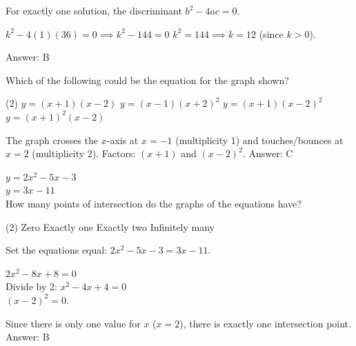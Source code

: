 \documentclass[11pt,paper=a4,answers]{exam}
\begin{document}
\begin{questions}
\begin{solution}
For exactly one solution, the discriminant $b^2 - 4ac = 0$.
\vspace{5pt}
\begin{center}
$k^2 - 4(1)(36) = 0 \implies k^2 - 144 = 0$
\vspace{5pt}
$k^2 = 144 \implies k = 12$ (since $k > 0$).
\end{center}
\vspace{5pt}
Answer: \colorbox{yellow!100}{B}
\end{solution}

\vspace{1cm}

\question
\begin{center}
\end{center}
Which of the following could be the equation for the graph shown?
\begin{tasks}(2)
    \task $y = (x+1)(x-2)$
    \task $y = (x-1)(x+2)^2$
    \task $y = (x+1)(x-2)^2$
    \task $y = (x+1)^2(x-2)$
\end{tasks}

\begin{solution}
The graph crosses the $x$-axis at $x = -1$ (multiplicity 1) and touches/bounces at $x = 2$ (multiplicity 2).
\vspace{5pt}
Factors: $(x + 1)$ and $(x - 2)^2$.
\vspace{5pt}
Answer: \colorbox{yellow!100}{C}
\end{solution}

\vspace{1cm}

\question
$y = 2x^2 - 5x - 3$ \\
$y = 3x - 11$ \\
How many points of intersection do the graphs of the equations have?
\begin{tasks}(2)
    \task Zero \task Exactly one \task Exactly two \task Infinitely many
\end{tasks}

\begin{solution}
Set the equations equal: $2x^2 - 5x - 3 = 3x - 11$.
\vspace{5pt}
\begin{center}
$2x^2 - 8x + 8 = 0$ \\
Divide by 2: $x^2 - 4x + 4 = 0$ \\
$(x - 2)^2 = 0$.
\end{center}
\vspace{5pt}
Since there is only one value for $x$ ($x=2$), there is exactly one intersection point.
\vspace{5pt}
Answer: \colorbox{yellow!100}{B}
\end{solution}


\end{questions}
\end{document}
